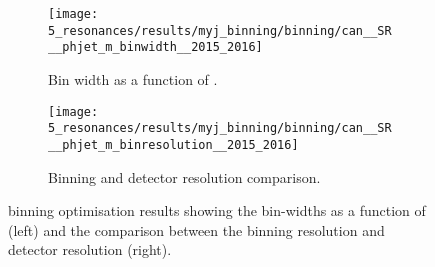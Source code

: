 \begin{figure}[ht!]
    \centering
    \begin{subfigure}[h]{0.49\linewidth}
        \centering
        \texttt{[image: 5\_resonances/results/myj\_binning/binning/can\_\_SR\_\_phjet\_m\_binwidth\_\_2015\_2016]}
        \caption{Bin width as a function of \myj.}
        \label{fig:bkg_modeling:observable:results:binwidth}
    \end{subfigure}
    \hfill
    \begin{subfigure}[h]{0.49\linewidth}
        \centering
        \texttt{[image: 5\_resonances/results/myj\_binning/binning/can\_\_SR\_\_phjet\_m\_binresolution\_\_2015\_2016]}
        \caption{Binning and detector resolution comparison.}
        \label{fig:bkg_modeling:observable:results:resolution_comparison}
    \end{subfigure}
    \caption{\myj binning optimisation results showing the bin-widths as a function of \myj (left) and the comparison between the binning resolution and detector resolution (right).}
    \label{fig:bkg_modeling:observable:results}
\end{figure}















